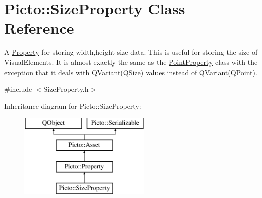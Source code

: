 \hypertarget{class_picto_1_1_size_property}{\section{Picto\-:\-:Size\-Property Class Reference}
\label{class_picto_1_1_size_property}
}


A \hyperlink{class_picto_1_1_property}{Property} for storing width,height size data. This is useful for storing the size of Visual\-Elements. It is almost exactly the same as the \hyperlink{class_picto_1_1_point_property}{Point\-Property} class with the exception that it deals with Q\-Variant(\-Q\-Size) values instead of Q\-Variant(\-Q\-Point).  




{\ttfamily \#include $<$Size\-Property.\-h$>$}

Inheritance diagram for Picto\-:\-:Size\-Property\-:\begin{figure}[H]
\begin{center}
\leavevmode
\includegraphics[height=4.000000cm]{class_picto_1_1_size_property}
\end{center}
\end{figure}
